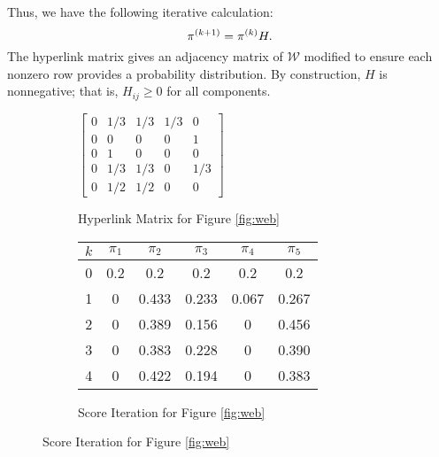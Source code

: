\documentclass[../exploring-pagerank.tex]{subfiles}
\begin{document}
 	Thus, we have the following iterative calculation:
 	\begin{equation}
 	    \pi^{(k+1)} = \pi^{(k)} H.
 	\end{equation}
    The hyperlink matrix gives an adjacency matrix of $\mathcal{W}$ modified to ensure each nonzero row provides a probability distribution. By construction, $H$ is nonnegative; that is, $H_{ij}\geq 0$ for all components.
    \begin{figure}[t!]
        \centering
        \begin{subfigure}
            \centering
            $\begin{bmatrix}
                0 & 1/3 & 1/3 & 1/3 & 0 \\
                0 & 0 & 0 & 0 & 1 \\
                0 & 1 & 0 & 0 & 0 \\
                0 & 1/3 & 1/3 & 0 & 1/3 \\
                0 & 1/2 & 1/2 & 0 & 0
            \end{bmatrix}$
            \caption{Hyperlink Matrix for Figure \ref{fig:web}}
            \label{fig:hyperlink}
        \end{subfigure}
        \vspace{2em}
        \begin{subfigure}
        \centering
        \begin{tabular}{|c||c|c|c|c|c|}
             \hline
             $k$ & $\pi_1$ & $\pi_2$ & $\pi_3$ & $\pi_4$ & $\pi_5$ \\
             \hline\hline
             0 & 0.2 & 0.2 & 0.2 & 0.2 & 0.2 \\
             1 & 0 & 0.433 & 0.233 & 0.067 & 0.267 \\
             2 & 0 & 0.389 & 0.156 & 0 & 0.456 \\
             3 & 0 & 0.383 & 0.228 & 0 & 0.390 \\
             4 & 0 & 0.422 & 0.194 & 0 & 0.383 \\
             \hline
        \end{tabular}
        \caption{Score Iteration for Figure \ref{fig:web}}
        \label{fig:example_calculation}
        \end{subfigure}
    \end{figure}
\end{document}
